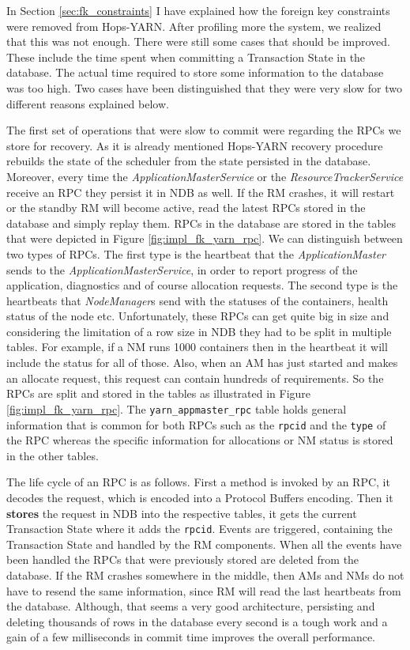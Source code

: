 In Section \ref{sec:fk_constraints} I have explained how the foreign
key constraints were removed from Hops-YARN. After profiling more the
system, we realized that this was not enough. There were still some
cases that should be improved.
These include the time spent when committing a Transaction
State in the database. The actual time required to store some
information to the database was too high. Two cases have been
distinguished that
they were very slow for two different reasons explained below.

The first set of operations that were slow to commit were regarding
the RPCs we store for recovery. As it is already mentioned Hops-YARN
recovery procedure rebuilds the state of the scheduler from the state
persisted in the database. Moreover, every time the
\emph{ApplicationMasterService} or the \emph{ResourceTrackerService}
receive an RPC they persist it in NDB as well. If the RM crashes, it
will restart or the standby RM will become active, read the latest
RPCs stored in the database and simply replay them. RPCs in the
database are stored in the tables that were depicted in Figure
\ref{fig:impl_fk_yarn_rpc}. We can distinguish between two types of
RPCs. The first type is the heartbeat that the
\emph{ApplicationMaster} sends to the \emph{ApplicationMasterService},
in order to report progress of the application, diagnostics and of
course allocation requests. The second type is the heartbeats that
\emph{NodeManager}s send with the statuses of the containers, health
status of the node etc. Unfortunately, these RPCs can get quite big
in size and considering the limitation of a row size in NDB they had
to be split in multiple tables. For example, if a NM runs 1000
containers then in the heartbeat it will include the status for all of
those. Also, when an AM has just started and makes an allocate
request, this request can contain hundreds of requirements. So the
RPCs are split and stored in the tables as illustrated in Figure
\ref{fig:impl_fk_yarn_rpc}. The \texttt{yarn\_appmaster\_rpc} table
holds general information that is common for both RPCs such as the
\texttt{rpcid} and the \texttt{type} of the RPC whereas the
specific information for allocations or NM status is stored in the
other tables.

The life cycle of an RPC is as follows. First a method is invoked by
an RPC, it decodes the request, which is encoded into a Protocol
Buffers encoding. Then it \textbf{stores} the request in NDB into the
respective tables, it gets the current Transaction State where it adds
the \texttt{rpcid}. Events are triggered, containing the
Transaction State and handled by the RM components. When all the
events have been handled the RPCs that were previously stored are deleted
from the database. If the RM crashes somewhere in the middle, then AMs
and NMs do not have to resend the same information, since RM will read
the last heartbeats from the database. Although, that seems a very
good architecture, persisting and deleting thousands of rows in the
database every second is a tough work and a gain of a few milliseconds
in commit time improves the overall performance.

